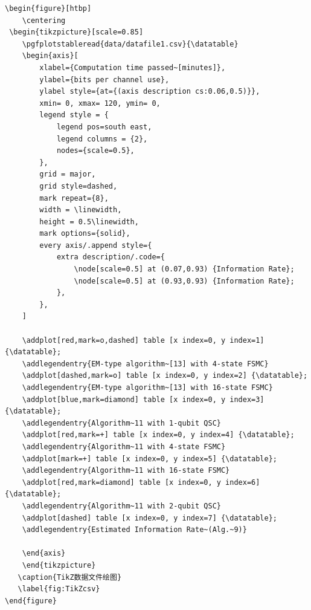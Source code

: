 {\wuhao
\begin{lstlisting}
\begin{figure}[htbp]
    \centering
 \begin{tikzpicture}[scale=0.85]
    \pgfplotstableread{data/datafile1.csv}{\datatable}
    \begin{axis}[
        xlabel={Computation time passed~[minutes]},
        ylabel={bits per channel use},
        ylabel style={at={(axis description cs:0.06,0.5)}},
        xmin= 0, xmax= 120, ymin= 0,
        legend style = {
            legend pos=south east,
            legend columns = {2},
            nodes={scale=0.5},
        },
        grid = major,
        grid style=dashed,
        mark repeat={8},
        width = \linewidth,
        height = 0.5\linewidth,
        mark options={solid},
        every axis/.append style={
            extra description/.code={
                \node[scale=0.5] at (0.07,0.93) {Information Rate};
                \node[scale=0.5] at (0.93,0.93) {Information Rate};
            },
        },
    ]

    \addplot[red,mark=o,dashed] table [x index=0, y index=1] {\datatable};
    \addlegendentry{EM-type algorithm~[13] with 4-state FSMC}
    \addplot[dashed,mark=o] table [x index=0, y index=2] {\datatable};
    \addlegendentry{EM-type algorithm~[13] with 16-state FSMC}
    \addplot[blue,mark=diamond] table [x index=0, y index=3] {\datatable};
    \addlegendentry{Algorithm~11 with 1-qubit QSC}
    \addplot[red,mark=+] table [x index=0, y index=4] {\datatable};
    \addlegendentry{Algorithm~11 with 4-state FSMC}
    \addplot[mark=+] table [x index=0, y index=5] {\datatable};
    \addlegendentry{Algorithm~11 with 16-state FSMC}
    \addplot[red,mark=diamond] table [x index=0, y index=6] {\datatable};
    \addlegendentry{Algorithm~11 with 2-qubit QSC}
    \addplot[dashed] table [x index=0, y index=7] {\datatable};
    \addlegendentry{Estimated Information Rate~(Alg.~9)}

    \end{axis}
    \end{tikzpicture}
   \caption{TikZ数据文件绘图}
   \label{fig:TikZcsv}
\end{figure}
\end{lstlisting}
}

